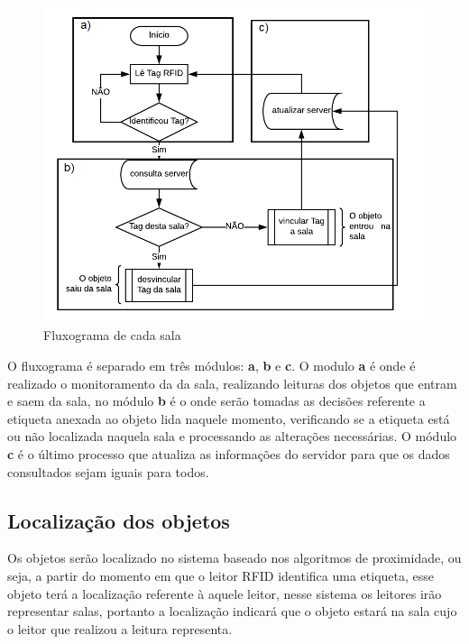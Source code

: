 \begin{figure}[H]
              \caption{\label{fig:fluxograma}{Fluxograma de cada sala}}
              \centering
              \includegraphics[width=1\textwidth]{Figuras/fluxograma.png}
\end{figure}

\par
O fluxograma é separado em três módulos: \textbf{a}, \textbf{b} e \textbf{c}. O modulo \textbf{a} é onde é realizado o 
monitoramento da da sala, realizando leituras dos objetos que entram e saem da sala, no módulo \textbf{b} é o onde serão 
tomadas as decisões referente a etiqueta anexada ao objeto lida naquele momento, verificando se a etiqueta está ou não 
localizada naquela sala e processando as alterações necessárias. O módulo \textbf{c} é o último processo que atualiza as 
informações do servidor para que os dados consultados sejam iguais para todos.


\subsection{Localização dos objetos}

Os objetos serão localizado no sistema baseado nos algoritmos de proximidade, ou seja, a partir do momento em que o leitor 
RFID identifica uma etiqueta, esse objeto terá a localização referente à aquele leitor, nesse sistema os leitores irão representar 
salas, portanto a localização indicará que o objeto estará na sala cujo o leitor que realizou a leitura representa.

